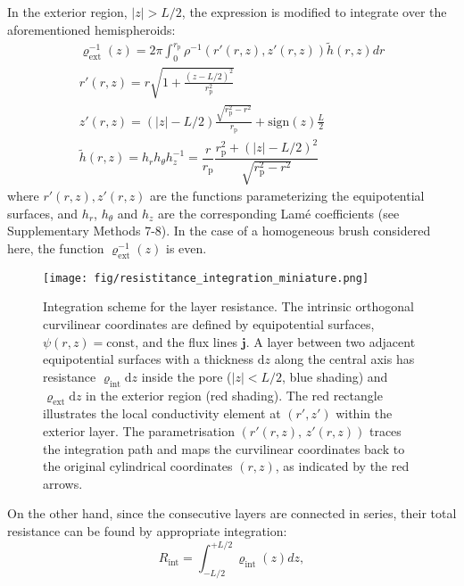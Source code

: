 \documentclass[12pt, a4paper]{article}
\begin{document}
In the exterior region, $|z| >L/2$, the expression is modified to integrate over the aforementioned hemispheroids:
\begin{equation}
    \begin{gathered}
        \varrho_{\text{ext}}^{-1}(z)= 2\pi\int_{0}^{r_{\text{p}}^{}} \rho^{-1}\left( r'(r,z), z'(r,z) \right)  \tilde{h} (r,z) dr\\
        r'(r,z) = r\sqrt{1 + \frac{(z - L/2)^2}{r_{\text{p}}^2}}\\
        z'(r,z) = (|z| - L/2) \frac{\sqrt{r_{\text{p}}^2 - r^2}}{r_{\text{p}}} +  \text{sign}(z) \frac{L}{2}\\
        \tilde{h} (r,z) = h_r h_{\theta} h_z^{-1} = \dfrac{r}{r_{\text{p}}}\dfrac{r_{\text{p}}^2 + (|z|-L/2)^2}{\sqrt{r_{\text{p}}^2 - r^2}}
    \end{gathered}
\label{eq:varrho2}
\end{equation}
where $r'(r,z) , z'(r,z)$ are the functions parameterizing the equipotential surfaces, and $h_r$, $h_{\theta}$ and $h_z$ are the corresponding Lam\'e coefficients (see Supplementary Methods 7-8). In the case of a homogeneous brush considered here, the function $\varrho_{\text{ext}}^{-1}(z)$ is even.

\begin{figure}
    \centering
    \texttt{[image: fig/resistitance\_integration\_miniature.png]}
    \caption{%
    Integration scheme for the layer resistance.  
    The intrinsic orthogonal curvilinear coordinates are defined by equipotential surfaces, $\psi(r,z)=\text{const}$, and the flux lines $\mathbf{j}$.  
    A layer between two adjacent equipotential surfaces with a thickness $\text{d}z$ along the central axis has resistance $\varrho_{\text{int}}\text{d}z$ inside the pore ($|z|<L/2$, blue shading) and $\varrho_{\text{ext}}\text{d}z$ in the exterior region (red shading).  
    The red rectangle illustrates the local conductivity element at $(r',z')$ within the exterior layer.  
    The parametrisation $(r'(r,z),\,z'(r,z))$ traces the integration path and maps the curvilinear coordinates back to the original cylindrical coordinates $(r,z)$, as indicated by the red arrows.%
    }
    \label{fig:integration_scheme}
\end{figure}

On the other hand, since the consecutive layers are connected in series, their total resistance can be found by appropriate integration:
\begin{equation}
    R_{\text{int}} = \int_{-L/2}^{+L/2}\varrho_{\text{int}}(z) dz,
    \label{R_int}
\end{equation}
\end{document}
